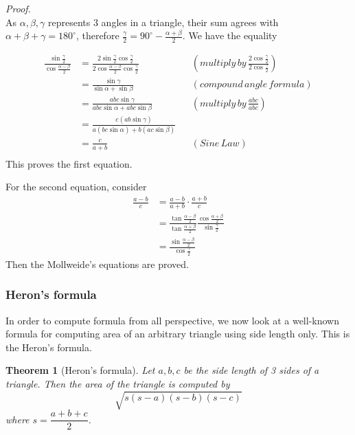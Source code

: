 \documentclass[12pt]{article}
\newtheorem*{theorem}{Theorem}
\renewenvironment{proof}[1][Proof]{\begin{snugshade*} \textit{{#1}.}\\}{\hfill \qedsymbol \end{snugshade*}}
\begin{document}
    \begin{proof}
        As $\alpha,\beta,\gamma$ represents 3 angles in a triangle, their sum agrees with $\alpha+\beta+\gamma=180^\circ$, therefore $\frac{\gamma}{2}=90^\circ - \frac{\alpha+\beta}{2}$. We have the equality 
        
        \begin{align*}
            \frac{\sin{\frac{\gamma}{2}}}{\cos{\frac{\alpha-\beta}{2}}}&=\frac{2\sin{\frac{\gamma}{2}}\cos{\frac{\gamma}{2}}}{2\cos{\frac{\alpha-\beta}{2}}\cos{\frac{\gamma}{2}}}&&(multiply\, by\, \frac{2\cos{\frac{\gamma}{2}}}{2\cos{\frac{\gamma}{2}}})\\
            &=\frac{\sin{\gamma}}{\sin{\alpha}+\sin{\beta}}&&(compound\, angle\, formula)\\
            &=\frac{abc\sin{\gamma}}{abc\sin{\alpha}+abc\sin{\beta}}&&(multiply\, by\, \frac{abc}{abc})\\
            &=\frac{c(ab\sin{\gamma})}{a(bc\sin{\alpha})+b(ac\sin{\beta})}\\
            &=\frac{c}{a+b}&&(Sine\, Law)\\
        \end{align*}
        This proves the first equation.

        For the second equation, consider \begin{align*}
            \frac{a-b}{c}&=\frac{a-b}{a+b}\cdot \frac{a+b}{c}\\
            &=\frac{\tan{\frac{\alpha-\beta}{2}}}{\tan{\frac{\alpha+\beta}{2}}}\frac{\cos{\frac{\alpha+\beta}{2}}}{\sin{\frac{\gamma}{2}}}\\
            &=\frac{\sin{\frac{\alpha-\beta}{2}}}{\cos{\frac{\gamma}{2}}}
        \end{align*}
        Then the Mollweide's equations are proved.
    \end{proof}

    \subsubsection*{Heron's formula}

    In order to compute formula from all perspective, we now look at a well-known formula for computing area of an arbitrary triangle using side length only. This is the Heron's formula.

    \begin{theorem}[Heron's formula]
        Let $a,b,c$ be the side length of 3 sides of a triangle. Then the area of the triangle is computed by $$\sqrt{s(s-a)(s-b)(s-c)}$$where $s=\dfrac{a+b+c}{2}$.
    \end{theorem}
\end{document}
